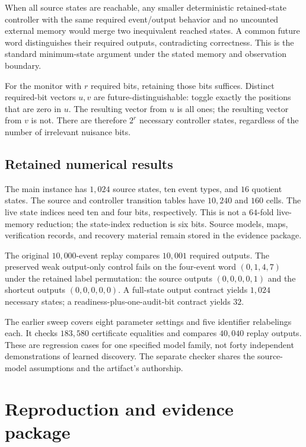 \documentclass[11pt,letterpaper]{article}
\theoremstyle{remark}\newtheorem{remark}{Remark}[section]
\begin{document}
When all source states are reachable, any smaller deterministic retained-state controller with the same required event/output behavior and no uncounted external memory would merge two inequivalent reached states. A common future word distinguishes their required outputs, contradicting correctness. This is the standard minimum-state argument under the stated memory and observation boundary.

For the monitor with $r$ required bits, retaining those bits suffices. Distinct required-bit vectors $u,v$ are future-distinguishable: toggle exactly the positions that are zero in $u$. The resulting vector from $u$ is all ones; the resulting vector from $v$ is not. There are therefore $2^r$ necessary controller states, regardless of the number of irrelevant nuisance bits.

\subsection{Retained numerical results}
The main instance has $1{,}024$ source states, ten event types, and $16$ quotient states. The source and controller transition tables have $10{,}240$ and $160$ cells. The live state indices need ten and four bits, respectively. This is not a $64$-fold live-memory reduction; the state-index reduction is six bits. Source models, maps, verification records, and recovery material remain stored in the evidence package.

The original $10{,}000$-event replay compares $10{,}001$ required outputs. The preserved weak output-only control fails on the four-event word $(0,1,4,7)$ under the retained label permutation: the source outputs $(0,0,0,0,1)$ and the shortcut outputs $(0,0,0,0,0)$. A full-state output contract yields $1{,}024$ necessary states; a readiness-plus-one-audit-bit contract yields $32$.

The earlier sweep covers eight parameter settings and five identifier relabelings each. It checks $183{,}580$ certificate equalities and compares $40{,}040$ replay outputs. These are regression cases for one specified model family, not forty independent demonstrations of learned discovery. The separate checker shares the source-model assumptions and the artifact's authorship.

\clearpage
\section{Reproduction and evidence package}\label{app:repro}
\end{document}
